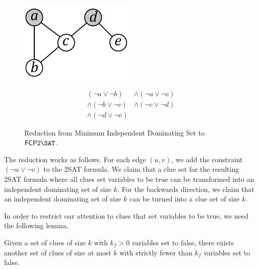 \documentclass[runningheads,a4paper]{llncs}
\begin{document}
\begin{figure}
\label{fig:2SATgraph}
\begin{minipage}{0.5\linewidth}
\centering
\includegraphics{2satreduct.pdf}
\end{minipage}
\hfill
\begin{minipage}{0.5\linewidth}
\centering
\begin{equation}
\begin{split}
(\neg a \vee \neg b)&\wedge(\neg a \vee \neg c) \\ \wedge(\neg b \vee \neg c) &\wedge (\neg c \vee \neg d) \\ \wedge(\neg d \vee \neg e)
\end{split}
\end{equation}
\end{minipage}
\caption{Reduction from Minimum Independent Dominating Set to $\mathsf{FCP} 2\SAT$.}
\end{figure}

The reduction works as follows. For each edge $(u,v)$, we add the constraint $(\neg u \vee \neg v)$ to the 2SAT formula. We claim that a clue set for the resulting 2SAT formula where all clues set variables to be true can be transformed into an independent dominating set of size $k$. For the backwards direction, we claim that an independent dominating set of size $k$ can be turned into a clue set of size $k$. 

%

In order to restrict our attention to clues that set variables to be true, we need the following lemma.

\begin{lemma} Given a set of clues of size $k$ with $k_f > 0$ variables set to false, there exists another set of clues of size at most $k$ with strictly fewer than $k_f$ variables set to false.
\end{lemma}
\end{document}
